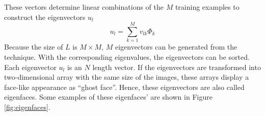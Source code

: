 These vectors determine linear combinations of the $M$ training examples to construct the eigenvectors $u_l$
\begin{equation}
 u_l = \sum_{k=1}^M v_{lk} \Phi_k
\end{equation}
Because the size of $L$ is $M\times M$, $M$ eigenvectors can be generated from the technique. With the corresponding eigenvalues, the eigenvectors can be sorted. Each eigenvector $u_l$ is an $N$ length vector. If the eigenvectors are transformed into two-dimensional array with the same size of the images, these arrays display a face-like appearance as ``ghost face''. Hence, these eigenvectors are also called eigenfaces. Some examples of these eigenfaces' are shown in \mbox{Figure} \ref{fig:eigenfaces}.
\begin{figure}[ht]

\end{figure}
